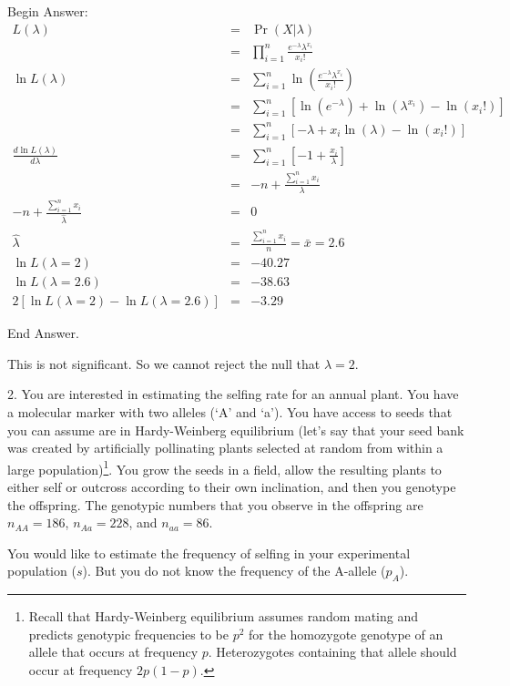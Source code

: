 \documentclass[11pt]{article}
\newcommand{\answer}[1]{{\color{red}\sc Begin Answer:\\}#1{\par\color{red}\sc End Answer.\\}}
\begin{document}
\answer{
\begin{eqnarray*}
	L(\lambda) & = & \Pr(X|\lambda) \\
		& = & \prod_{i=1}^{n}\frac{e^{-\lambda}\lambda^{x_i}}{x_i!} \\
	\ln L(\lambda) & = & \sum_{i=1}^{n}\ln\left(\frac{e^{-\lambda}\lambda^{x_i}}{x_i!}\right) \\
	& = & \sum_{i=1}^{n}\left[\ln \left(e^{-\lambda}\right) + \ln \left(\lambda^{x_i}\right) - \ln \left(x_i!\right)\right] \\
	& = & \sum_{i=1}^{n}\left[-\lambda + {x_i}\ln \left(\lambda\right) - \ln \left(x_i!\right)\right] \\
	\frac{d \ln L(\lambda)}{d \lambda} & = & \sum_{i=1}^{n}\left[-1 + \frac{x_i}{\lambda}\right] \\
	& = & -n + \frac{\sum_{i=1}^{n}x_i}{\lambda} \\
	-n + \frac{\sum_{i=1}^{n}x_i}{\hat\lambda} & = & 0 \\
	\hat\lambda & = & \frac{\sum_{i=1}^{n}x_i}{n} = \bar x = 2.6 \\
	\ln L(\lambda = 2 ) & = & -40.27\\
	\ln L(\lambda = 2.6 ) & = & -38.63 \\
	2 \left[\ln L(\lambda = 2 ) - \ln L(\lambda = 2.6 )\right] & = &  -3.29
\end{eqnarray*}
}
This is not significant.  So we cannot reject the null that $\lambda = 2$.
\newpage


2. You are interested in estimating the selfing rate for an annual plant.  You have a molecular marker with two alleles (`A' and `a'). You have access to seeds that you can assume are in Hardy-Weinberg equilibrium (let's say that your seed bank was created by artificially pollinating plants selected at random from within a large population)\footnote{Recall that Hardy-Weinberg equilibrium assumes random mating and predicts genotypic frequencies to be $p^2$ for the homozygote genotype of an allele that occurs at frequency $p$. Heterozygotes containing that allele should occur at frequency $2p(1-p)$.}.  You grow the seeds in a field, allow the resulting plants to either self or outcross according to their own inclination, and then you genotype the offspring.
The genotypic numbers that you observe in the offspring are $n_{AA} = 186$, $n_{Aa} = 228$, and $n_{aa} = 86$.

You would like to estimate the frequency of selfing in your experimental population ($s$).  But you do not know the frequency of the A-allele ($p_A$).
\end{document}
